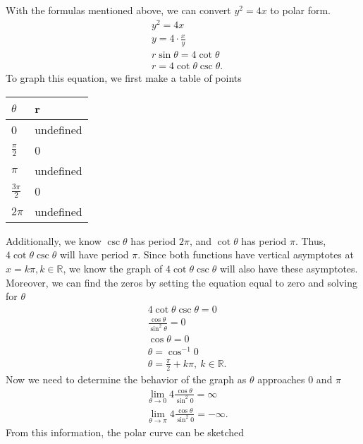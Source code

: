 \documentclass{report}
\begin{document}
    With the formulas mentioned above, we can convert $y^{2} = 4x$ to polar form.
    \begin{align*}
        &y^{2} = 4x \\
        &y= 4\cdot \frac{x}{y} \\
        &r\sin{\theta } = 4\cot{\theta} \\
        &r = 4\cot{\theta}\csc{\theta}
    .\end{align*}
    To graph this equation, we first make a table of points
    \bigbreak \noindent 
    \begin{tabularx}{\textwidth}{|X|X|}
        \hline
        $\theta$ & r \\
        \hline
        0 & undefined \\
        $\frac{\pi}{2}$ & 0 \\
        $\pi$ & undefined\\
        $\frac{3\pi}{2}$ & 0 \\
        $2\pi$ & undefined\\
        \hline
    \end{tabularx}
    \bigbreak \noindent 
    Additionally, we know $\csc{\theta }$ has period $2\pi$, and $\cot{\theta }$ has period $\pi$. Thus, $4\cot{\theta }\csc{\theta }$ will have period $\pi$. Since both functions have vertical asymptotes at $x=k\pi, k\in\mathbb{R}$, we know the graph of $4\cot{\theta }\csc{\theta }$ will also have these asymptotes. Moreover, we can find the zeros by setting the equation equal to zero and solving for $\theta  $
    \begin{align*}
        &4\cot{\theta }\csc{\theta } = 0 \\
        &\frac{\cos{\theta }}{\sin^{2}{\theta }} = 0 \\
        &\cos{\theta } = 0 \\
        &\theta = \cos^{-1}{0} \\
        &\theta  = \frac{\pi}{2} + k\pi,\ k\in\mathbb{R}
    .\end{align*}
    Now we need to determine the behavior of the graph as $\theta$ approaches $0$ and $\pi$
    \begin{align*}
        &\lim\limits_{\theta  \to 0}{4 \frac{\cos{\theta }}{\sin^{2}{0}}} = \infty \\
        &\lim\limits_{\theta  \to \pi}{4 \frac{\cos{\theta }}{\sin^{2}{0}}} = -\infty
    .\end{align*}
    From this information, the polar curve can be sketched
    \pagebreak 
    \begin{figure}[ht]
        \centering
        \label{fig:p2}
    \end{figure}
\end{document}

